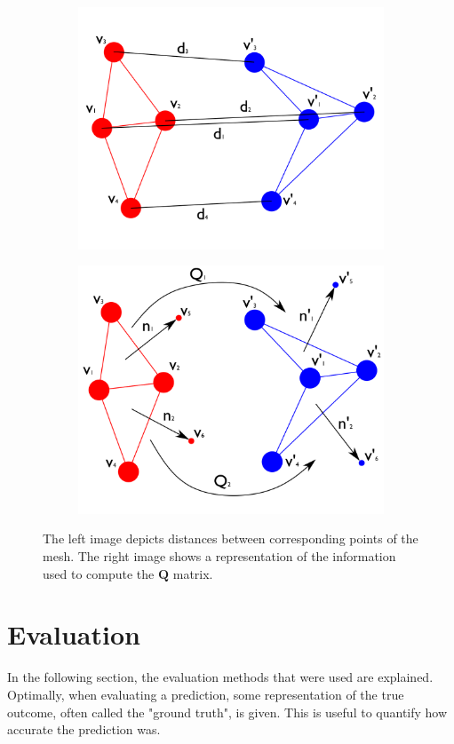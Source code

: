 \begin{figure}
\centering
\begin{subfigure}{.5\textwidth}
  \centering
  \includegraphics[width=.75\linewidth]{figures/pediag}
\end{subfigure}%
\begin{subfigure}{.5\textwidth}
  \centering
  \includegraphics[width=.75\linewidth]{figures/dediag}
\end{subfigure}
\caption[Error metric diagrams]{The left image depicts distances between corresponding points of the mesh. The right image shows a representation of the information used to compute the $\mathbf{Q}$ matrix.}
\label{fig:errordiag}
\end{figure}

\section{Evaluation}
In the following section, the evaluation methods that were used are explained. Optimally, when evaluating a prediction, some representation of the true outcome, often called the "ground truth", is given. This is useful to quantify how accurate the prediction was.
